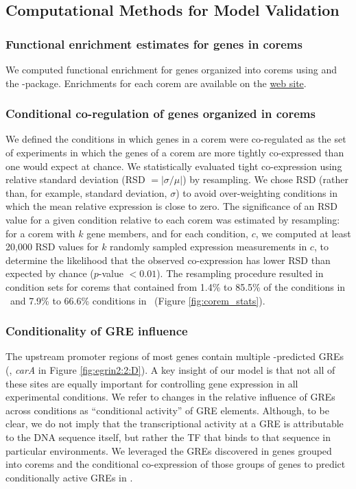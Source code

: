 \subsection{Computational Methods for Model Validation}

\subsubsection{Functional enrichment estimates for genes in corems}

We computed functional enrichment for genes organized into corems using  \cite{dennis_david:_2003} and the  \cite{day_davidquery:_2010} -package. Enrichments for each corem are available on the \href{http://egrin2.systemsbiology.net}{web site}.

\subsubsection{Conditional co-regulation of genes organized in corems}
\label{section:rsd}

We defined the conditions in which genes in a corem were co-regulated as the set of experiments in which the genes of a corem are more tightly co-expressed than one would expect at chance. We statistically evaluated tight co-expression using relative standard deviation (RSD $=|\sigma/\mu|$) by resampling. We chose RSD (rather than, for example, standard deviation, $\sigma$) to avoid over-weighting conditions in which the mean relative expression is close to zero. The significance of an RSD value for a given condition relative to each corem was estimated by resampling: for a corem with $k$ gene members, and for each condition, $c$, we computed at least 20,000 RSD values for $k$ randomly sampled expression measurements in $c$, to determine the likelihood that the observed co-expression has lower RSD than expected by chance ($p$-value $< 0.01$). The resampling procedure resulted in condition sets for corems that contained from 1.4\% to 85.5\% of the conditions in \halo\ and 7.9\% to 66.6\% conditions in \eco\ (Figure \ref{fig:corem_stats}).

\subsubsection{Conditionality of GRE influence}

The upstream promoter regions of most genes contain multiple \egrine-predicted GREs (\eg, \textit{carA} in Figure \ref{fig:egrin2:2:D}). A key insight of our model is that not all of these sites are equally important for controlling gene expression in all experimental conditions. We refer to changes in the relative influence of GREs across conditions as ``conditional activity'' of GRE elements. Although, to be clear, we do not imply that the transcriptional activity at a GRE is attributable to the DNA sequence itself, but rather the TF that binds to that sequence in particular environments. We leveraged the GREs discovered in genes grouped into corems and the conditional co-expression of those groups of genes to predict conditionally active GREs in \egrine.

